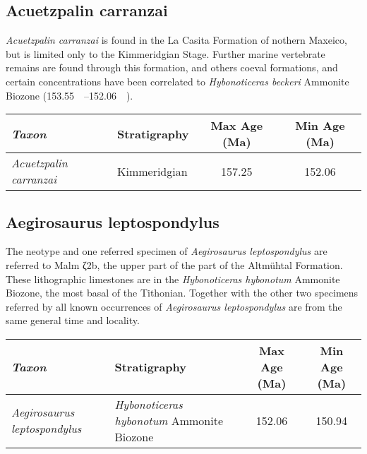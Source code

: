 \documentclass[british]{article}
\begin{document}
\subsection{Acuetzpalin carranzai}%
\label{sub:acuetzpalin-carranzai}

\emph{Acuetzpalin carranzai} is found in the La Casita Formation of nothern
Maxeico, but is limited only to the Kimmeridgian
Stage.\autocite{BarrientosLara2020JSAES} Further marine vertebrate remains are
found through this formation, and others coeval formations, and certain
concentrations have been correlated to \emph{Hybonoticeras beckeri} Ammonite
Biozone (\SIrange{153.55}{152.06}{\mega\annum}).\autocite{Zell2014JSAES}

\begin{table}[htb]
    \footnotesize
    \begin{tabu}{>{\em}lXSS}
        \toprule
        Taxon & Stratigraphy & {Max Age (Ma)} & {Min Age (Ma)} \\
        \midrule
        Acuetzpalin carranzai & Kimmeridgian & 157.25 & 152.06 \\
        \bottomrule
    \end{tabu}
\end{table}

\subsection{Aegirosaurus leptospondylus}%
\label{sub:aegirosaurus-leptospondylus}

The neotype and one referred specimen of \emph{Aegirosaurus leptospondylus} are
referred to Malm ζ2b, the upper part of the part of the Altmühtal
Formation.\autocite{Bardet2000JP} These lithographic limestones are in the
\emph{Hybonoticeras hybonotum} Ammonite Biozone, the most basal of the
Tithonian. Together with the other two specimens referred by
\textcite{Bardet2000JP} all known occurrences of \emph{Aegirosaurus
leptospondylus} are from the same general time and locality.

\begin{table}[htb]
    \footnotesize
    \begin{tabu}{>{\em}lXSS}
        \toprule
        Taxon                       & Stratigraphy & {Max Age (Ma)} & {Min Age (Ma)} \\
        \midrule
        Aegirosaurus leptospondylus & \emph{Hybonoticeras hybonotum} Ammonite Biozone & 152.06 & 150.94 \\
        \bottomrule
    \end{tabu}
\end{table}
\end{document}
